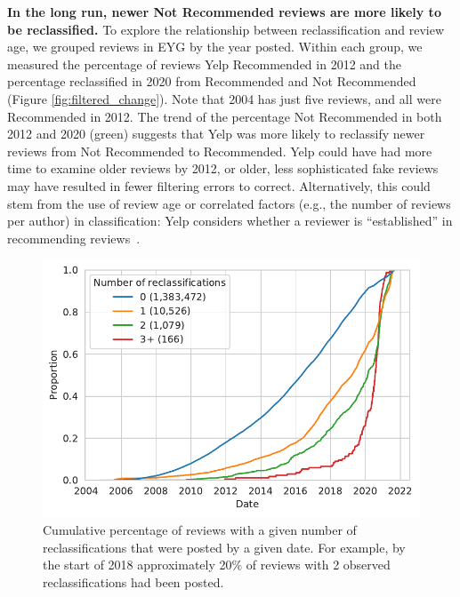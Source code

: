 \textbf{In the long run, newer Not Recommended reviews are more likely to be reclassified.} To explore the relationship between reclassification and review age, we grouped reviews in EYG by the year posted. Within each group, we measured the percentage of reviews Yelp Recommended in 2012 and the percentage reclassified in 2020 from Recommended and Not Recommended (Figure \ref{fig:filtered_change}). Note that 2004 has just five reviews, and all were Recommended in 2012. The trend of the percentage Not Recommended in both 2012 and 2020 (green) suggests that Yelp was more likely to reclassify newer reviews from Not Recommended to Recommended. Yelp could have had more time to examine older reviews by 2012, or older, less sophisticated fake reviews may have resulted in fewer filtering errors to correct. Alternatively, this could stem from the use of review age or correlated factors (e.g., the number of reviews per author) in classification: Yelp considers whether a reviewer is ``established'' in recommending reviews~\cite{yelpwhyrec}.

\begin{figure}[t]
    \centering
    \includegraphics[width=0.9\columnwidth]{figures/reclassification_by_date_grouped_chicago.pdf}
    \caption{Cumulative percentage of reviews with a given number of reclassifications that were posted by a given date. For example, by the start of 2018 approximately 20\% of reviews with 2 observed reclassifications had been posted.}
    \label{fig:reclassification_by_date_chicago}
\end{figure}

